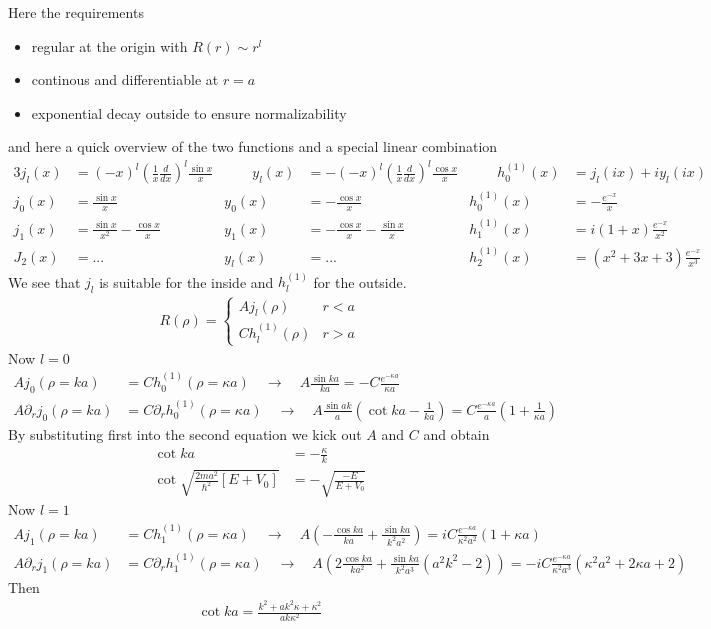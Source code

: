 \documentclass[10pt,a4paper]{book}
\theoremstyle{definition}
\begin{document}
Here the requirements
\begin{itemize}
\item regular at the origin with $R(r)\sim r^l$
\item continous and differentiable at $r=a$
\item exponential decay outside to ensure normalizability
\end{itemize}
and here a quick overview of the two functions and a special linear combination
\begin{alignat*}{3}
j_l(x)&=(-x)^l\left(\frac{1}{x}\frac{d}{dx}\right)^l\frac{\sin x}{x} & \qquad y_l(x)&=-(-x)^l\left(\frac{1}{x}\frac{d}{dx}\right)^l\frac{\cos x}{x} &\qquad  h^{(1)}_0(x)&=j_l(ix)+iy_l(ix)\\
j_0(x)&=\frac{\sin x}{x}                                             & y_0(x)&=-\frac{\cos x}{x}                    & h^{(1)}_0(x)&=-\frac{e^{-x}}{x}\\
j_1(x)&=\frac{\sin x}{x^2}-\frac{\cos x}{x}                          & y_1(x)&=-\frac{\cos x}{x}-\frac{\sin x}{x}   & h^{(1)}_1(x)&=i(1+x)\frac{e^{-x}}{x^2}\\
J_2(x)&=...                                                          & y_l(x)&=...                                  & h^{(1)}_2(x)&=(x^2+3x+3)\frac{e^{-x}}{x^3} 
\end{alignat*} 
We see that $j_l$ is suitable for the inside and $h^{(1)}_l$ for the outside.
\begin{align}
R(\rho)=\left\{\begin{matrix}
Aj_l(\rho) & r<a\\
Ch^{(1)}_l(\rho) & r>a
\end{matrix}\right.
\end{align}
Now $l=0$
\begin{align}
Aj_0(\rho=ka)&=Ch^{(1)}_0(\rho=\kappa a)\quad\rightarrow\quad A\frac{\sin ka}{ka}=-C\frac{e^{-\kappa a}}{\kappa a}\\
A\partial_r j_0(\rho=ka)&=C\partial_r h^{(1)}_0(\rho=\kappa a)\quad\rightarrow\quad 
%
A\frac{\sin ak}{a}\left(\cot ka-\frac{1}{ka}\right)=C\frac{e^{-\kappa a}}{a}\left(1+\frac{1}{\kappa a}\right)
\end{align}
By substituting first into the second equation we kick out $A$ and $C$ and obtain
\begin{align}
\cot ka&=-\frac{\kappa}{k}\\
\cot\sqrt{\frac{2ma^2}{\hbar^2}[E+V_0]}&=-\sqrt{\frac{-E}{E+V_0}}
\end{align}
Now $l=1$
\begin{align}
Aj_1(\rho=ka)&=Ch^{(1)}_1(\rho=\kappa a)\quad\rightarrow\quad A\left(-\frac{\cos ka}{ka}+\frac{\sin ka}{k^2a^2}\right)=iC\frac{e^{-\kappa a}}{\kappa^2 a^2}(1+\kappa a)\\
A\partial_r j_1(\rho=ka)&=C\partial_r h^{(1)}_1(\rho=\kappa a)\quad\rightarrow\quad A\left(2\frac{\cos ka}{ka^2}+\frac{\sin ka}{k^2a^3}(a^2k^2-2)\right)=-iC\frac{e^{-\kappa a}}{\kappa^2 a^3}(\kappa^2 a^2+2\kappa a +2)
\end{align}
Then
\begin{align}
\cot ka=\frac{k^2+ak^2\kappa+\kappa^2}{ak\kappa^2}
\end{align}
\end{document}

